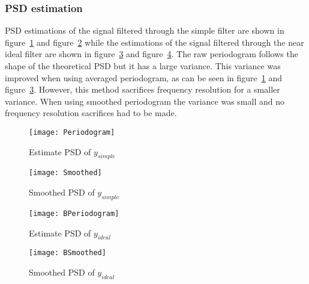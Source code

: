 \documentclass[10pt]{article}
\begin{document}
\clearpage

\subsubsection{PSD estimation}


PSD estimations of the signal filtered through the simple filter are
shown in figure~\ref{fig:PSDest} and figure~\ref{fig:PSDSmooth} while the estimations of the signal
filtered through the near ideal filter are shown in figure~\ref{fig:BPSDest} and
figure~\ref{fig:BPSDSmooth}. The raw periodogram follows the shape of the theoretical
PSD but it has a large variance. This variance was improved when using averaged periodogram,
 as can be seen in figure~\ref{fig:PSDest} and figure~\ref{fig:BPSDest}.
 However, this method sacrifices frequency resolution for a smaller variance.
 When using smoothed periodogram the variance was small and no frequency
 resolution sacrifices had to be made.


\begin{figure}[!hp]

    \begin{center}
      \texttt{[image: Periodogram]}
    \caption{Estimate PSD of $y_{simple}$ \label{fig:PSDest}}
    \end{center}

\end{figure}

\begin{figure}[!hp]

    \begin{center}
      \texttt{[image: Smoothed]}
    \caption{Smoothed PSD of $y_{simple}$ \label{fig:PSDSmooth}}
    \end{center}

\end{figure}

\begin{figure}[!hp]

    \begin{center}
      \texttt{[image: BPeriodogram]}
    \caption{Estimate PSD of $y_{ideal}$ \label{fig:BPSDest}}
    \end{center}

\end{figure}

\begin{figure}[!hp]

    \begin{center}
      \texttt{[image: BSmoothed]}
    \caption{Smoothed PSD of $y_{ideal}$ \label{fig:BPSDSmooth}}
    \end{center}

\end{figure}
\end{document}
